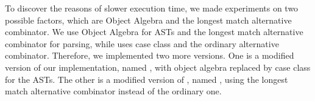 To discover the reasons of slower execution time, we made experiments
on two possible factors, which are Object Algebra and the longest match alternative combinator.
We use Object Algebra for ASTs and the longest match alternative combinator \inlinecode{|||} for parsing,
while \ilyaimpl{} uses case class and the ordinary alternative combinator.
Therefore, we implemented two more versions. One is a modified version of our implementation,
named \ourclass{}, with object algebra replaced by case class for the ASTs.
The other is a modified version of \ilyaimpl{}, named \ilyalongest{},
using the longest match alternative combinator instead of the ordinary one.

